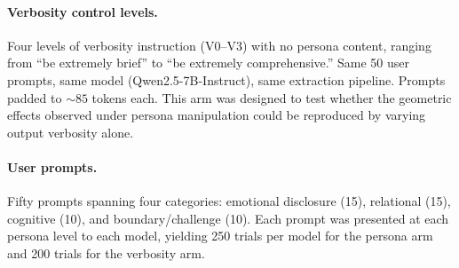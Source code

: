 \documentclass[11pt]{article}
\begin{document}
\paragraph{Verbosity control levels.} Four levels of verbosity instruction (V0--V3) with no persona content, ranging from ``be extremely brief'' to ``be extremely comprehensive.'' Same 50 user prompts, same model (Qwen2.5-7B-Instruct), same extraction pipeline. Prompts padded to ${\sim}85$ tokens each. This arm was designed to test whether the geometric effects observed under persona manipulation could be reproduced by varying output verbosity alone.

\paragraph{User prompts.} Fifty prompts spanning four categories: emotional disclosure (15), relational (15), cognitive (10), and boundary/challenge (10). Each prompt was presented at each persona level to each model, yielding 250 trials per model for the persona arm and 200 trials for the verbosity arm.
\end{document}
